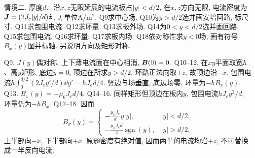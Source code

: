 \begin{exercise}
情境二. 厚度$d$、沿$x,z$无限延展的电流板占$|y|<d/2$, 在$x,z$方向无限, 电流密度为$\boldsymbol{J}=(2J_e|y|/d)\hat{\boldsymbol{z}}$, $J_e$单位A/m$^2$.
Q9求中心场.
Q10为$y>d/2$选并画安培回路, 标尺寸.
Q11求包围电流.
Q12求环量.
Q13求板外场.
Q14为$0<y<d/2$选并画回路.
Q15求包围电流.
Q16求环量.
Q17求板内场.
Q18依对称性求$y<0$场, 画有符号$B_x(y)$图并标轴. 另说明方向及矩形对称.
\end{exercise}
\begin{solution}
Q9. $J(y)$偶对称, 上下薄电流面在中心相消, $\boldsymbol{B}(0)=0$.
Q10--12. 在$xy$平面取宽$h$、高$y$矩形, 底边$y=0$, 顶边在所求$y>d/2$. 环路正法向取$+z$, 故顶边沿$-x$. 包围电流$h\int_0^{d/2}(2J_ey'/d)\dd y'=hJ_ed/4$. 竖边与场垂直, 底边场零, 环量为$-hB_x(y)$.
Q13. $B_x(y)=-\mu_0J_ed/4$.
Q14--16. 同样矩形但顶边在板内$y$, 包围电流$hJ_ey^2/d$, 环量仍为$-hB_x$.
Q17--18. 因而
\[
B_x(y)=\begin{cases}\displaystyle-\frac{\mu_0J_e}{d}y|y|,&|y|<d/2,\\
\displaystyle-\frac{\mu_0J_ed}4\operatorname{sgn}(y),&|y|>d/2.
\end{cases}
\]
上半部向$-x$, 下半部向$+x$. 原题密度有绝对值, 因而两半的电流均沿$+z$, 不可替换成一半反向电流.
\begin{center}\quad
{}\end{center}
\end{solution}

